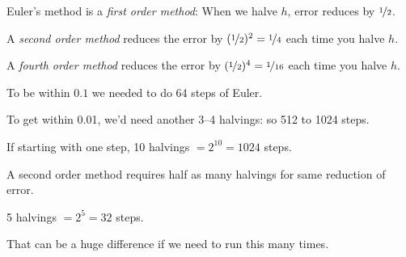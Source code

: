 \documentclass[10pt,aspectratio=169]{beamer}
\begin{document}
\begin{frame}

Euler's method is a \emph{first order method}:
When we halve $h$, error reduces by $\nicefrac{1}{2}$.

\medskip
\pause

A \emph{second order method} reduces the error by
$(\nicefrac{1}{2})^2 = \nicefrac{1}{4}$ each time you halve $h$.

\medskip
\pause

A \emph{fourth order method} reduces the error by
$(\nicefrac{1}{2})^4 = \nicefrac{1}{16}$ each time you halve $h$.

\medskip
\pause

To be within $0.1$ we needed to do 64 steps of Euler.

\medskip
\pause

To get within 0.01, we'd need another 3--4 halvings: so 512 to 1024 steps.

\medskip
\pause

If starting with one step, 10 halvings ${} = 2^{10} = 1024$ steps.

\medskip
\pause

A second order method requires half as many halvings for same
reduction of error.

\medskip
\pause

5 halvings ${} = 2^{5} = 32$ steps.

\medskip
\pause

That can be a huge difference if we need to run this many times.
\end{frame}
\end{document}
